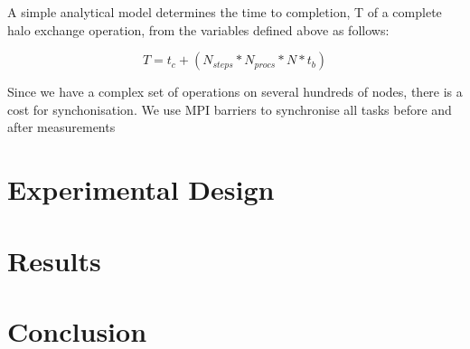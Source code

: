 \documentclass[conference,10pt]{IEEEtran}
\begin{document}
A simple analytical model determines the time to completion, T of a complete halo exchange operation,
from the variables defined above as follows:

\begin{equation}
  T = t_c + (N_{steps} * N_{procs} * N * t_b)
\end{equation}

Since we have a complex set of operations on several hundreds of nodes, there is a cost for synchonisation.
We use MPI barriers to synchronise all tasks before and after measurements

\section{Experimental Design}

\section{Results}

\section{Conclusion}




\end{document}
